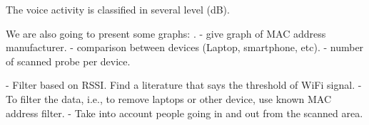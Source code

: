 \documentclass{article}
\begin{document}
The voice activity is classified in several level (dB).

We are also going to present some graphs: .
	- give graph of MAC address manufacturer.
	- comparison between devices (Laptop, smartphone, etc).
	- number of scanned probe per device.

- Filter based on RSSI. Find a literature that says the threshold of WiFi signal.
- To filter the data, i.e., to remove laptops or other device, use known MAC address filter.
- Take into account people going in and out from the scanned area.


% 
\end{document}
